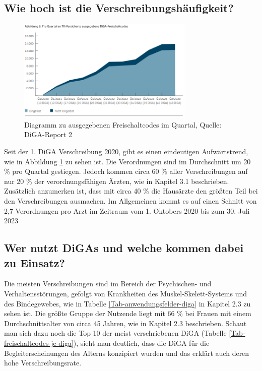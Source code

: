 \documentclass{article}
\begin{document}
		\subsection{Wie hoch ist die Verschreibungshäufigkeit?}
			\begin{figure}[htbp]
				\centering
				\includegraphics[width=0.75\textwidth]{./grafiken/abbildung-verschreibungstrend}
				\caption[Ausgegebene Freischaltcodes im Quartal]{Diagramm zu ausgegebenen Freischaltcodes im Quartal, Quelle: DiGA-Report 2 \cite{TK-Report-2}}
				\label{Abb-verschreibungstrend}
			\end{figure}
			Seit der 1. DiGA Verschreibung 2020, gibt es einen eindeutigen Aufwärtstrend, wie in Abbildung \ref{Abb-verschreibungstrend} zu sehen ist. Die Verordnungen sind im Durchschnitt um 20 \% pro Quartal gestiegen. Jedoch kommen circa 60 \% aller Verschreibungen auf nur 20 \% der verordnungsfähigen Ärzten, wie in Kapitel 3.1 beschrieben. Zusätzlich anzumerken ist, dass mit circa 40 \% die Hausärzte den größten Teil bei den Verschreibungen ausmachen. Im Allgemeinen kommt es auf einen Schnitt von 2,7 Verordnungen pro Arzt im Zeitraum vom 1. Oktobers 2020 bis zum 30. Juli 2023   
		\subsection{Wer nutzt DiGAs und welche kommen dabei zu Einsatz?}
			Die meisten Verschreibungen sind im Bereich der Psychischen- und Verhaltensstörungen, gefolgt von Krankheiten des Muskel-Skelett-Systems und des Bindegewebes, wie in Tabelle \ref{Tab-anwendungsfelder-diga} in Kapitel 2.3 zu sehen ist. Die größte Gruppe der Nutzende liegt mit 66 \% bei Frauen mit einem Durchschnittsalter von circa 45 Jahren, wie in Kapitel 2.3 beschrieben. Schaut man sich dazu noch die Top 10 der meist verschriebenen DiGA (Tabelle \ref{Tab-freischaltcodes-je-diga}), sieht man deutlich, dass die DiGA für die Begleiterscheinungen des Alterns konzipiert wurden und das erklärt auch deren hohe Verschreibungsrate.                       
\end{document}
